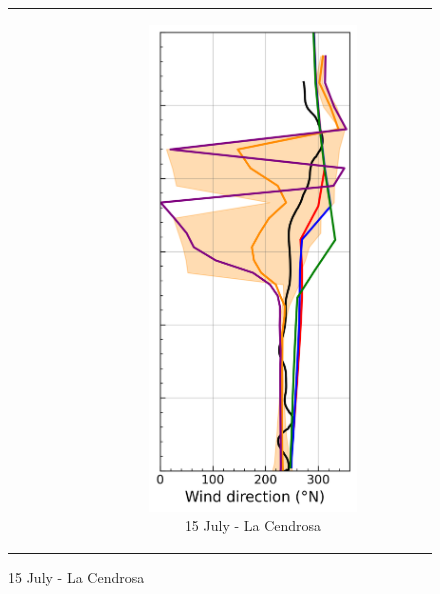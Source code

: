 \begin{figure}[hbtp]
{\begin{tabular}{@{}cccc@{}}
\begin{subfigure}[t]{0.283\textwidth}
        \end{subfigure} &
        \begin{subfigure}[t]{0.283\textwidth}
            \caption{15 July - La Cendrosa}
            \includegraphics[width=\textwidth]{images/chap6/profiles/profile_cendrosa_wind_direction_1507_.png}

\end{subfigure}
\end{tabular}}
\end{figure}
